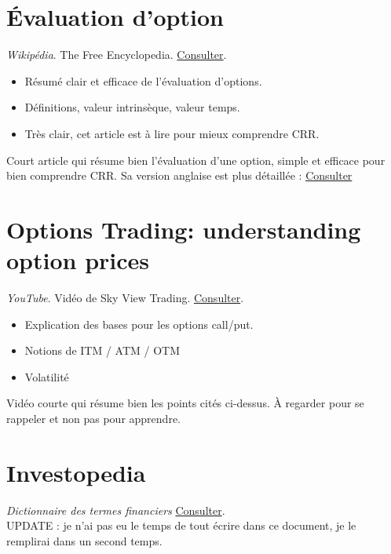 \documentclass[a4paper,10pt]{article}
\begin{document}
\section*{Évaluation d'option}
{}
\textit{Wikipédia}. The Free Encyclopedia. \href{https://fr.wikipedia.org/wiki/Évaluation_d%27option}{Consulter}.
\begin{itemize}
    \item Résumé clair et efficace de l'évaluation d'options.
    \item Définitions, valeur intrinsèque, valeur temps.
    \item Très clair, cet article est à lire pour mieux comprendre CRR.
\end{itemize}
Court article qui résume bien l'évaluation d'une option, simple et efficace pour bien comprendre CRR. Sa version anglaise est plus détaillée : \href{https://en.wikipedia.org/wiki/Valuation_of_options}{Consulter}

\section*{Options Trading: understanding option prices}
{}
\textit{YouTube}. Vidéo de Sky View Trading. \href{https://youtu.be/MiybniIIvx0?si=ohfR6c83wdCrzKVJ}{Consulter}.
\begin{itemize}
    \item Explication des bases pour les options call/put.
    \item Notions de ITM / ATM / OTM
    \item Volatilité
\end{itemize}
Vidéo courte qui résume bien les points cités ci-dessus. À regarder pour se rappeler et non pas pour apprendre.

\section*{Investopedia}
{}
\textit{Dictionnaire des termes financiers} \href{https://www.investopedia.com/financial-term-dictionary-4769738}{Consulter}.
\\

\noindent UPDATE : je n'ai pas eu le temps de tout écrire dans ce document, je le remplirai dans un second temps.
\end{document}
